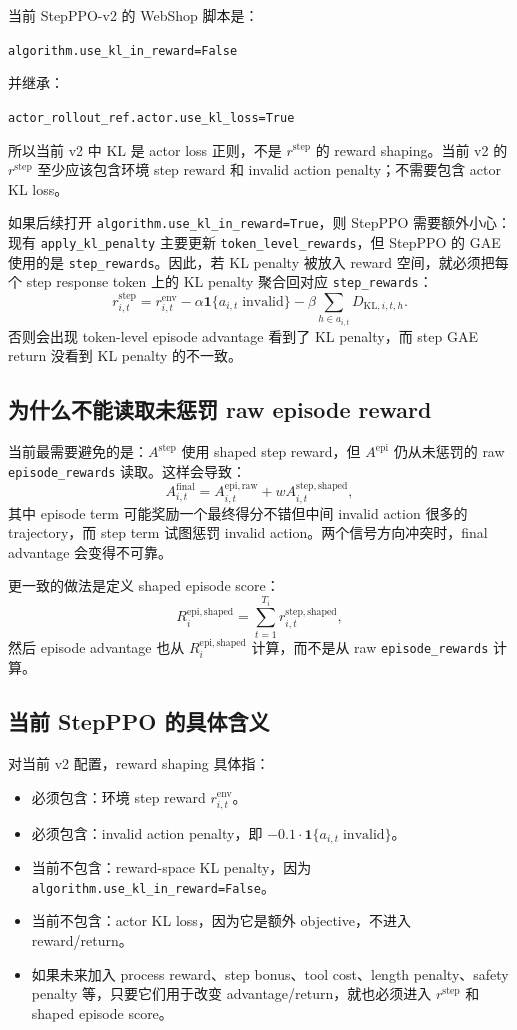 \documentclass[10pt]{ctexart}
\newcommand{\code}[1]{\texttt{#1}}
\begin{document}
当前 StepPPO-v2 的 WebShop 脚本是：
\begin{center}
\code{algorithm.use\_kl\_in\_reward=False}
\end{center}
并继承：
\begin{center}
\code{actor\_rollout\_ref.actor.use\_kl\_loss=True}
\end{center}
所以当前 v2 中 KL 是 actor loss 正则，不是 \(r^{\mathrm{step}}\) 的 reward shaping。当前 v2 的 \(r^{\mathrm{step}}\) 至少应该包含环境 step reward 和 invalid action penalty；不需要包含 actor KL loss。

如果后续打开 \code{algorithm.use\_kl\_in\_reward=True}，则 StepPPO 需要额外小心：现有 \code{apply\_kl\_penalty} 主要更新 \code{token\_level\_rewards}，但 StepPPO 的 GAE 使用的是 \code{step\_rewards}。因此，若 KL penalty 被放入 reward 空间，就必须把每个 step response token 上的 KL penalty 聚合回对应 \code{step\_rewards}：
\[
r^{\mathrm{step}}_{i,t}
= r^{\mathrm{env}}_{i,t}
-\alpha\mathbf{1}\{a_{i,t}\;\text{invalid}\}
-\beta\sum_{h\in a_{i,t}}D_{\mathrm{KL},i,t,h}.
\]
否则会出现 token-level episode advantage 看到了 KL penalty，而 step GAE return 没看到 KL penalty 的不一致。

\subsection*{为什么不能读取未惩罚 raw episode reward}
当前最需要避免的是：\(A^{\mathrm{step}}\) 使用 shaped step reward，但 \(A^{\mathrm{epi}}\) 仍从未惩罚的 raw \code{episode\_rewards} 读取。这样会导致：
\[
A^{\mathrm{final}}_{i,t}
= A^{\mathrm{epi,raw}}_{i,t}+wA^{\mathrm{step,shaped}}_{i,t},
\]
其中 episode term 可能奖励一个最终得分不错但中间 invalid action 很多的 trajectory，而 step term 试图惩罚 invalid action。两个信号方向冲突时，final advantage 会变得不可靠。

更一致的做法是定义 shaped episode score：
\[
R^{\mathrm{epi,shaped}}_i
=\sum_{t=1}^{T_i} r^{\mathrm{step,shaped}}_{i,t},
\]
然后 episode advantage 也从 \(R^{\mathrm{epi,shaped}}_i\) 计算，而不是从 raw \code{episode\_rewards} 计算。

\subsection*{当前 StepPPO 的具体含义}
对当前 v2 配置，reward shaping 具体指：
\begin{itemize}
  \item 必须包含：环境 step reward \(r^{\mathrm{env}}_{i,t}\)。
  \item 必须包含：invalid action penalty，即 \(-0.1\cdot\mathbf{1}\{a_{i,t}\;\text{invalid}\}\)。
  \item 当前不包含：reward-space KL penalty，因为 \code{algorithm.use\_kl\_in\_reward=False}。
  \item 当前不包含：actor KL loss，因为它是额外 objective，不进入 reward/return。
  \item 如果未来加入 process reward、step bonus、tool cost、length penalty、safety penalty 等，只要它们用于改变 advantage/return，就也必须进入 \(r^{\mathrm{step}}\) 和 shaped episode score。
\end{itemize}
\end{document}
